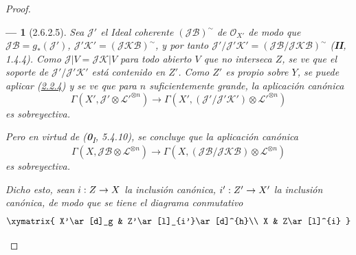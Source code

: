 \documentclass[10pt,oneside,openany]{book}
\theoremstyle{egaenv}\newtheorem*{env}{---}
\theoremstyle{egastatement}
\theoremstyle{egadescription}
\renewcommand{\to}{\mathchoice{\longrightarrow}{\rightarrow}{\rightarrow}{\rightarrow}}
\begin{document}
\begin{proof}
\begin{env}[2.6.2.5]
Sea $\mathcal J'$ el Ideal coherente $(\mathcal J\mathcal B)^\sim$ de
$\mathcal O_{X'}$ de modo que $\mathcal J\mathcal B=g_*(\mathcal J')$,
$\mathcal J'\mathcal K'=(\mathcal J\mathcal K\mathcal B)^\sim$, y por
tanto
$\mathcal J'/\mathcal J'\mathcal K'
=(\mathcal J\mathcal B/\mathcal J\mathcal K\mathcal B)^\sim$
(\textbf{II}, 1.4.4). Como $\mathcal J|V=\mathcal J\mathcal K|V$ para todo
abierto $V$ que no interseca $Z$, se ve que el soporte de
$\mathcal J'/\mathcal J'\mathcal K'$ está \emph{contenido en} $Z'$. Como $Z'$ es
propio sobre $Y$, se puede aplicar (\hyperref[III.2.2.4-fr]{2.2.4}) y se
ve que para $n$ suficientemente grande, la aplicación canónica
\[
\Gamma(X',\mathcal J'\otimes\mathcal L'^{\otimes n})
\longrightarrow
\Gamma(X',(\mathcal J'/\mathcal J'\mathcal K')
\otimes\mathcal L'^{\otimes n})
\]
es \emph{sobreyectiva}.

Pero en virtud de (\textbf{0}\textsubscript{I}, 5.4.10), se
concluye que la aplicación canónica
\[
\Gamma(X,\mathcal J\mathcal B\otimes\mathcal L^{\otimes n})
\longrightarrow
\Gamma(X,(\mathcal J\mathcal B/\mathcal J\mathcal K\mathcal B)
\otimes\mathcal L^{\otimes n})
\]
es \emph{sobreyectiva}.

Dicho esto, sean $i:Z\to X$ la inclusión canónica,
$i':Z'\to X'$ la inclusión canónica, de modo que se tiene el diagrama
conmutativo
\[
\xymatrix{
X'\ar[d]_g & Z'\ar[l]_{i'}\ar[d]^{h}\\
X & Z\ar[l]^{i}
}
\]


\end{env}
\end{proof}
\end{document}
